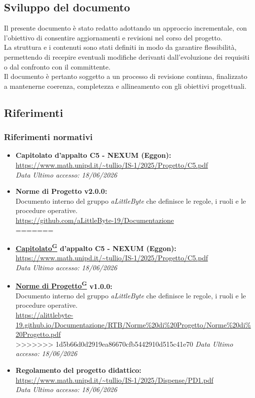 ﻿\documentclass[a4paper,12pt]{article}
\providecommand{\glslink}[2]{\href{https://alittlebyte-19.github.io/Documentazione/glossario.html\#gls-#1}{\underline{#2}\textsuperscript{\scriptsize G}}}
\begin{document}
\subsection{Sviluppo del documento}
Il presente documento è stato redatto adottando un approccio incrementale, con l’obiettivo di consentire aggiornamenti e revisioni nel corso del progetto.\\
La struttura e i contenuti sono stati definiti in modo da garantire flessibilità, permettendo di recepire eventuali modifiche derivanti dall’evoluzione dei requisiti o dal confronto con il committente.\\
Il documento è pertanto soggetto a un processo di revisione continua, finalizzato a mantenerne coerenza, completezza e allineamento con gli obiettivi progettuali.

\subsection{Riferimenti}
\subsubsection{Riferimenti normativi}
\begin{itemize}
<<<<<<< HEAD
    \item \textbf{Capitolato d'appalto C5 - NEXUM (Eggon):}\\
    \url{https://www.math.unipd.it/~tullio/IS-1/2025/Progetto/C5.pdf}\\
    \textit{Data Ultimo accesso: 18/06/2026}

    \item \textbf{Norme di Progetto v2.0.0:}\\
    Documento interno del gruppo \textit{aLittleByte} che definisce le regole, i ruoli e le procedure operative.\\
    \url{https://github.com/aLittleByte-19/Documentazione}\\
=======
    \item \textbf{\glslink{capitolato}{Capitolato} d'appalto C5 - NEXUM (Eggon):}\\
    \url{https://www.math.unipd.it/~tullio/IS-1/2025/Progetto/C5.pdf}\\
    \textit{Data Ultimo accesso: 18/06/2026}

    \item \textbf{\glslink{norme-di-progetto}{Norme di Progetto} v1.0.0:}\\
    Documento interno del gruppo \textit{aLittleByte} che definisce le regole, i ruoli e le procedure operative.\\
    \url{https://alittlebyte-19.github.io/Documentazione/RTB/Norme%20di%20Progetto/Norme%20di%20Progetto.pdf}\\
>>>>>>> 1d5b66d0d2919ea86670cfb5442910d515c41e70
    \textit{Data Ultimo accesso: 18/06/2026}

    \item \textbf{Regolamento del progetto didattico:}\\
    \url{https://www.math.unipd.it/~tullio/IS-1/2025/Dispense/PD1.pdf}\\
    \textit{Data Ultimo accesso: 18/06/2026}
\end{itemize}
\end{document}
